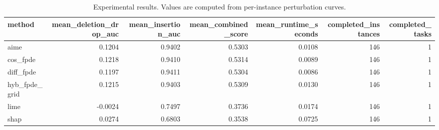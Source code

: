 \begin{table}[t]
\caption{Experimental results. Values are computed from per-instance perturbation curves.}
\label{tab:main_results_computed}
\centering
\begin{tabular}{lrrrrrr}
\toprule
method & mean\_deletion\_drop\_auc & mean\_insertion\_auc & mean\_combined\_score & mean\_runtime\_seconds & completed\_instances & completed\_tasks \\
\midrule
aime & 0.1204 & 0.9402 & 0.5303 & 0.0108 & 146 & 1 \\
cos\_fpde & 0.1218 & 0.9410 & 0.5314 & 0.0089 & 146 & 1 \\
diff\_fpde & 0.1197 & 0.9411 & 0.5304 & 0.0086 & 146 & 1 \\
hyb\_fpde\_grid & 0.1215 & 0.9403 & 0.5309 & 0.0130 & 146 & 1 \\
lime & -0.0024 & 0.7497 & 0.3736 & 0.0174 & 146 & 1 \\
shap & 0.0274 & 0.6803 & 0.3538 & 0.0725 & 146 & 1 \\
\bottomrule
\end{tabular}

\end{table}
